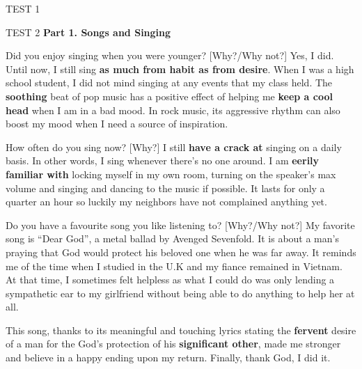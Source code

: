 \begin{glossarymc}[Cambridge 12]
\begin{test}{TEST 1}
\begin{VocabHighlights}
    \end{VocabHighlights}
    \end{test}

    \begin{test}{TEST 2}
    \noindent
    \textbf{Part 1. Songs and Singing}
    \begin{qa}{Did you enjoy singing when you were younger? [Why?/Why not?]}
    Yes, I did. Until now, I still sing \textbf{as much from habit as from desire}. When I was a high school student, I did not mind singing at any events that my class held. The \textbf{soothing} beat of pop music has a positive effect of helping me \textbf{keep a cool head} when I am in a bad mood. In rock music, its aggressive rhythm can also boost my mood when I need a source of inspiration.
    \end{qa}

    \begin{qa}{How often do you sing now? [Why?]}
    I still \textbf{have a crack at} singing on a daily basis. In other words, I sing whenever there’s no one around. I am \textbf{eerily familiar with} locking myself in my own room, turning on the speaker’s max volume and singing and dancing to the music if possible. It lasts for only a quarter an hour so luckily my neighbors have not complained anything yet.
    \end{qa}

    \begin{qa}{Do you have a favourite song you like listening to? [Why?/Why not?]}
    My favorite song is “Dear God”, a metal ballad by Avenged Sevenfold. It is about a man’s praying that God would protect his beloved one when he was far away. It reminds me of the time when I studied in the U.K and my fiance remained in Vietnam. At that time, I sometimes felt helpless as what I could do was only lending a sympathetic ear to my girlfriend without being able to do anything to help her at all.  

    This song, thanks to its meaningful and touching lyrics stating the \textbf{fervent} desire of a man for the God’s protection of his \textbf{significant other}, made me stronger and believe in a happy ending upon my return. Finally, thank God, I did it.
    \end{qa}


\end{test}
\end{glossarymc}
